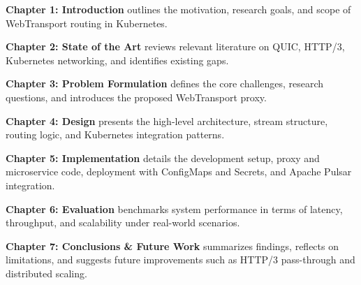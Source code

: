 \textbf{Chapter 1: Introduction} outlines the motivation, research goals, and scope of WebTransport routing in Kubernetes.

\textbf{Chapter 2: State of the Art} reviews relevant literature on QUIC, HTTP/3, Kubernetes networking, and identifies existing gaps.

\textbf{Chapter 3: Problem Formulation} defines the core challenges, research questions, and introduces the proposed WebTransport proxy.

\textbf{Chapter 4: Design} presents the high-level architecture, stream structure, routing logic, and Kubernetes integration patterns.

\textbf{Chapter 5: Implementation} details the development setup, proxy and microservice code, deployment with ConfigMaps and Secrets, and Apache Pulsar integration.

\textbf{Chapter 6: Evaluation} benchmarks system performance in terms of latency, throughput, and scalability under real-world scenarios.

\textbf{Chapter 7: Conclusions \& Future Work} summarizes findings, reflects on limitations, and suggests future improvements such as HTTP/3 pass-through and distributed scaling.
